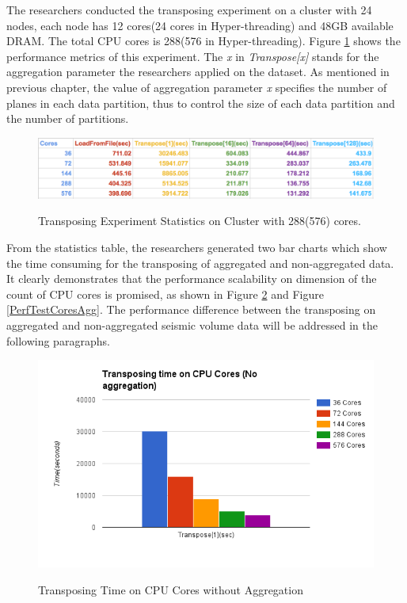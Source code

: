The researchers conducted the transposing experiment on a cluster with 24 nodes, each node has 12 cores(24 cores in Hyper-threading) and 48GB available DRAM. The total CPU cores is 288(576 in Hyper-threading). Figure \ref{TestStat} shows the performance metrics of this experiment. The \emph{x} in \emph{Transpose[x]} stands for the aggregation parameter the researchers applied on the dataset. As mentioned in previous chapter, the value of aggregation parameter \emph{x} specifies the number of planes in each data partition, thus to control the size of each data partition and the number of partitions. 

\begin{figure}[h]
\centering
\includegraphics[scale=0.6]{figures/TestStat.png}\\
\caption{Transposing Experiment Statistics on Cluster with 288(576) cores.}\label{TestStat}
\end{figure}

From the statistics table, the researchers generated two bar charts which show the time consuming for the transposing of aggregated and non-aggregated data. It clearly demonstrates that the performance scalability on dimension of the count of CPU cores is promised, as shown in Figure \ref{PerfTestCoresNoAgg} and  Figure \ref{PerfTestCoresAgg}. The performance difference between the transposing on aggregated and non-aggregated seismic volume data will be addressed in the following paragraphs.

\begin{figure}[ht]
\centering
\includegraphics[scale=0.7]{figures/PerfTestCoresNoAgg.png}\\
\caption{Transposing Time on CPU Cores without Aggregation}\label{PerfTestCoresNoAgg}
\end{figure}

